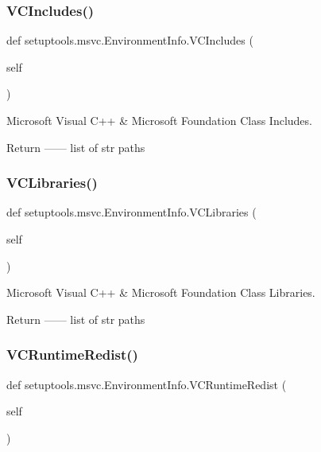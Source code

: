 \subsubsection{\texorpdfstring{V\+C\+Includes()}{VCIncludes()}}
{\footnotesize\ttfamily def setuptools.\+msvc.\+Environment\+Info.\+V\+C\+Includes (\begin{DoxyParamCaption}\item[{}]{self }\end{DoxyParamCaption})}

\begin{DoxyVerb}Microsoft Visual C++ & Microsoft Foundation Class Includes.

Return
------
list of str
    paths
\end{DoxyVerb}
 \mbox{\label{classsetuptools_1_1msvc_1_1EnvironmentInfo_a801f70fc7fcfdee61534e8ffa5153eb2}} 
\subsubsection{\texorpdfstring{V\+C\+Libraries()}{VCLibraries()}}
{\footnotesize\ttfamily def setuptools.\+msvc.\+Environment\+Info.\+V\+C\+Libraries (\begin{DoxyParamCaption}\item[{}]{self }\end{DoxyParamCaption})}

\begin{DoxyVerb}Microsoft Visual C++ & Microsoft Foundation Class Libraries.

Return
------
list of str
    paths
\end{DoxyVerb}
 \mbox{\label{classsetuptools_1_1msvc_1_1EnvironmentInfo_a2ad0b92bc587a134b6eddb0b970df495}} 
\subsubsection{\texorpdfstring{V\+C\+Runtime\+Redist()}{VCRuntimeRedist()}}
{\footnotesize\ttfamily def setuptools.\+msvc.\+Environment\+Info.\+V\+C\+Runtime\+Redist (\begin{DoxyParamCaption}\item[{}]{self }\end{DoxyParamCaption})}

